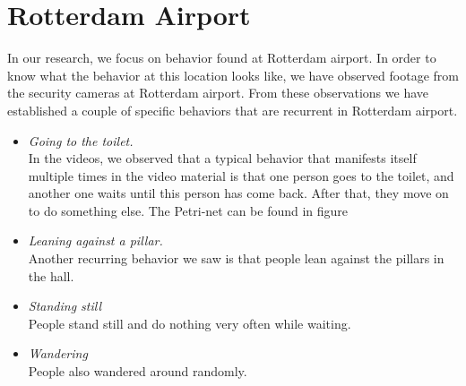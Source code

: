 \documentclass[11pt, a4paper]{book}
\begin{document}
\section{Rotterdam Airport}
\label{sec:rotterdamAirportMethod}
In our research, we focus on behavior found at Rotterdam airport. In order to know what the behavior at this location looks like, we have observed footage from the security cameras at Rotterdam airport. From these observations we have established a couple of specific behaviors that are recurrent in Rotterdam airport.

\begin{itemize}
\item \emph{Going to the toilet.}
\\In the videos, we observed that a typical behavior that manifests itself multiple times in the video material is that one person goes to the toilet, and another one waits until this person has come back. After that, they move on to do something else. The Petri-net can be found in figure

\item \emph{Leaning against a pillar.}
\\Another recurring behavior we saw is that people lean against the pillars in the hall. 

\item \emph{Standing still}\\
People stand still and do nothing very often while waiting.

\item \emph{Wandering}\\
People also wandered around randomly.
\end{itemize}
\end{document}
